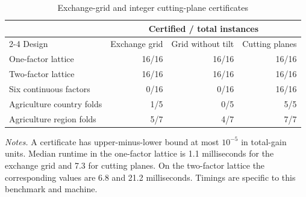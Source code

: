 \begin{table}[htbp]
\centering
\small
\caption{Exchange-grid and integer cutting-plane certificates}
\label{tab:exchange_grid}
\begin{tabular}{lrrr}
\toprule
& \multicolumn{3}{c}{Certified / total instances}\\
\cmidrule(lr){2-4}
Design & Exchange grid & Grid without tilt & Cutting planes\\
\midrule
One-factor lattice & 16/16 & 16/16 & 16/16\\
Two-factor lattice & 16/16 & 16/16 & 16/16\\
Six continuous factors & 0/16 & 0/16 & 16/16\\
Agriculture country folds & 1/5 & 0/5 & 5/5\\
Agriculture region folds & 5/7 & 4/7 & 7/7\\
\bottomrule
\end{tabular}
\begin{minipage}{0.9\textwidth}\footnotesize\smallskip
\emph{Notes.} A certificate has upper-minus-lower bound at most $10^{-5}$ in
total-gain units. Median runtime in the one-factor lattice is 1.1 milliseconds
for the exchange grid and 7.3 for cutting planes. On the two-factor lattice the
corresponding values are 6.8 and 21.2 milliseconds. Timings are specific to this
benchmark and machine.
\end{minipage}
\end{table}

